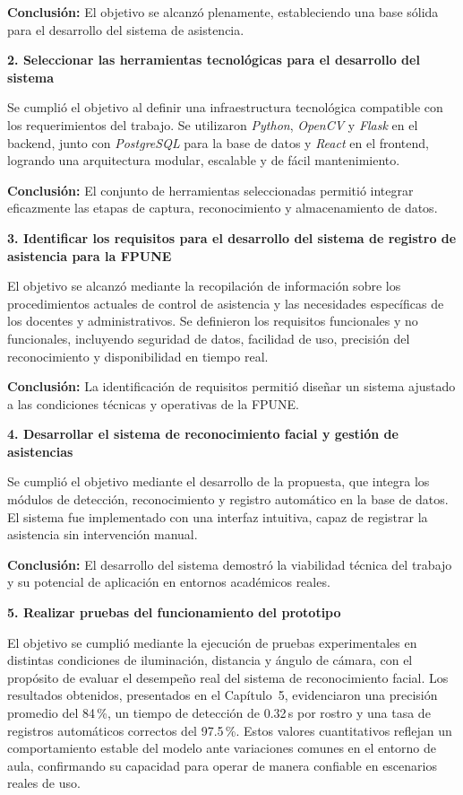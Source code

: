 \textbf{Conclusión:} El objetivo se alcanzó plenamente, estableciendo una base sólida para el desarrollo del sistema de asistencia.

\textbf{2. Seleccionar las herramientas tecnológicas para el desarrollo del sistema}

Se cumplió el objetivo al definir una infraestructura tecnológica compatible con los requerimientos del trabajo. Se utilizaron \textit{Python}, \textit{OpenCV} y \textit{Flask} en el backend, junto con \textit{PostgreSQL} para la base de datos y \textit{React} en el frontend, logrando una arquitectura modular, escalable y de fácil mantenimiento.

\textbf{Conclusión:} El conjunto de herramientas seleccionadas permitió integrar eficazmente las etapas de captura, reconocimiento y almacenamiento de datos. \par

\textbf{3. Identificar los requisitos para el desarrollo del sistema de registro de asistencia para la FPUNE}

El objetivo se alcanzó mediante la recopilación de información sobre los procedimientos actuales de control de asistencia y las necesidades específicas de los docentes y administrativos. Se definieron los requisitos funcionales y no funcionales, incluyendo seguridad de datos, facilidad de uso, precisión del reconocimiento y disponibilidad en tiempo real.

\textbf{Conclusión:} La identificación de requisitos permitió diseñar un sistema ajustado a las condiciones técnicas y operativas de la FPUNE. \par

\textbf{4. Desarrollar el sistema de reconocimiento facial y gestión de asistencias}

Se cumplió el objetivo mediante el desarrollo de la propuesta, que integra los módulos de detección, reconocimiento y registro automático en la base de datos. El sistema fue implementado con una interfaz intuitiva, capaz de registrar la asistencia sin intervención manual.

\textbf{Conclusión:} El desarrollo del sistema demostró la viabilidad técnica del trabajo y su potencial de aplicación en entornos académicos reales. \par

\textbf{5. Realizar pruebas del funcionamiento del prototipo}

El objetivo se cumplió mediante la ejecución de pruebas experimentales en distintas condiciones de iluminación, distancia y ángulo de cámara, con el propósito de evaluar el desempeño real del sistema de reconocimiento facial. Los resultados obtenidos, presentados en el Capítulo~5, evidenciaron una precisión promedio del 84\,\%, un tiempo de detección de 0.32\,s por rostro y una tasa de registros automáticos correctos del 97.5\,\%. Estos valores cuantitativos reflejan un comportamiento estable del modelo ante variaciones comunes en el entorno de aula, confirmando su capacidad para operar de manera confiable en escenarios reales de uso.

